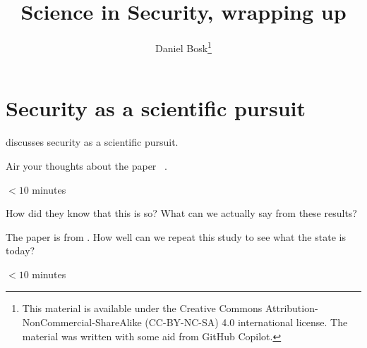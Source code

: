 \title{%
  Science in Security,
  wrapping up
}
\author{Daniel Bosk\thanks{%
    This material is available under the Creative Commons 
    Attribution-NonCommercial-ShareAlike (CC-BY-NC-SA) 4.0 international 
    license.
    The material was written with some aid from GitHub Copilot.
}}

\begin{frame}
  \maketitle
\end{frame}

\mode*

\begin{abstract}
  
\end{abstract}

\clearpage

\section{Security as a scientific pursuit}

\Textcite{SoKScienceOfSecurity} discusses security as a scientific pursuit.

\begin{frame}
  \begin{exercise}
    Air your thoughts about the paper 
    ~\autocite{SoKScienceOfSecurity}.
  \end{exercise}

  \begin{center}
    \(<10\) minutes
  \end{center}
\end{frame}

\begin{frame}
  \begin{question}
    How did they\autocite{SoKScienceOfSecurity} know that this is so?
    What can we actually say from these results?
  \end{question}

  \begin{question}
    The paper\autocite{SoKScienceOfSecurity} is from 
    \citeyear{SoKScienceOfSecurity}.
    How well can we repeat this study to see what the state is today?
  \end{question}

  \begin{center}
    \(<10\) minutes
  \end{center}
\end{frame}


